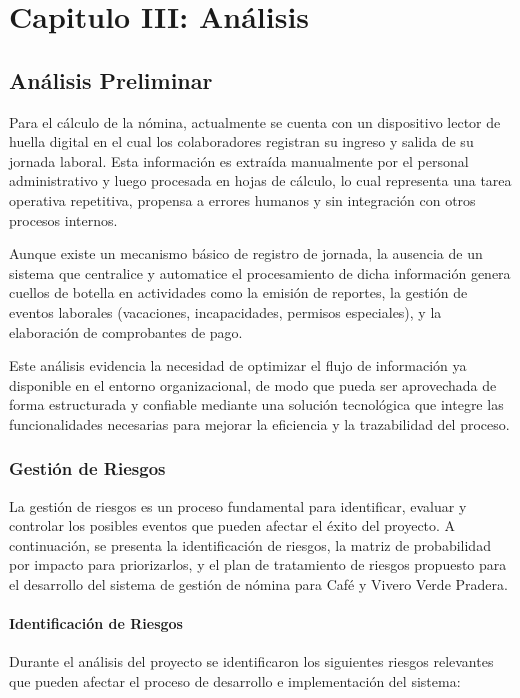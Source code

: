 \chapter{\textbf{Capitulo III: Análisis}}

\section{Análisis Preliminar}

Para el cálculo de la nómina, actualmente se cuenta con un dispositivo lector de huella digital en el cual los colaboradores registran su ingreso y salida de su jornada laboral. Esta información es extraída manualmente por el personal administrativo y luego procesada en hojas de cálculo, lo cual representa una tarea operativa repetitiva, propensa a errores humanos y sin integración con otros procesos internos.

Aunque existe un mecanismo básico de registro de jornada, la ausencia de un sistema que centralice y automatice el procesamiento de dicha información genera cuellos de botella en actividades como la emisión de reportes, la gestión de eventos laborales (vacaciones, incapacidades, permisos especiales), y la elaboración de comprobantes de pago.

Este análisis evidencia la necesidad de optimizar el flujo de información ya disponible en el entorno organizacional, de modo que pueda ser aprovechada de forma estructurada y confiable mediante una solución tecnológica que integre las funcionalidades necesarias para mejorar la eficiencia y la trazabilidad del proceso.

\subsection{Gestión de Riesgos}

La gestión de riesgos es un proceso fundamental para identificar, evaluar y controlar los posibles eventos que pueden afectar el éxito del proyecto. A continuación, se presenta la identificación de riesgos, la matriz de probabilidad por impacto para priorizarlos, y el plan de tratamiento de riesgos propuesto para el desarrollo del sistema de gestión de nómina para Café y Vivero Verde Pradera.

\subsubsection*{Identificación de Riesgos}

Durante el análisis del proyecto se identificaron los siguientes riesgos relevantes que pueden afectar el proceso de desarrollo e implementación del sistema:

